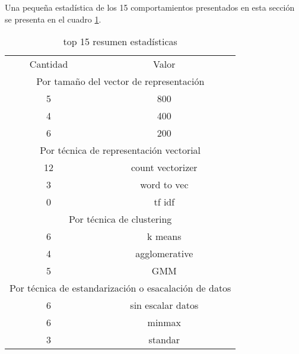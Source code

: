 \documentclass[12pt]{article}
\begin{document}
			Una pequeña estadística de los 15 comportamientos presentados en esta sección se presenta en el cuadro \ref{tab:top_15_resumen_estadísticas}.
			 
		\begin{table}[H]
		\begin{tabular}{cc}
		\multicolumn{1}{c|}{Cantidad}              & Valor                         \\ 
		\multicolumn{2}{c}{Por tamaño del vector de representación}               \\ \hline
		\multicolumn{1}{c|}{5}                     & 800                           \\ 
		\multicolumn{1}{c|}{4}                     & 400                           \\ 
		\multicolumn{1}{c|}{6}                     & 200                           \\ 
		\multicolumn{2}{c}{Por técnica de representación vectorial}               \\ \hline
		\multicolumn{1}{c|}{12}                    & count vectorizer              \\ 
		\multicolumn{1}{c|}{3}                     & word to vec                   \\ 
		\multicolumn{1}{c|}{0}                     & tf idf                        \\ 
		\multicolumn{2}{c}{Por técnica de clustering}                             \\ \hline
		\multicolumn{1}{c|}{6}                     & k means                       \\ 
		\multicolumn{1}{c|}{4}                     & agglomerative                 \\ 
		\multicolumn{1}{c|}{5}                     & GMM                           \\ 
		\multicolumn{2}{c}{Por técnica de estandarización o esacalación de datos} \\ \hline
		\multicolumn{1}{c|}{6}                     & sin escalar datos             \\ 
		\multicolumn{1}{c|}{6}                     & minmax                        \\ 
		\multicolumn{1}{c|}{3}                     & standar                       \\ 
		\end{tabular}
		\centering
		\caption{top 15 resumen estadísticas}
		\label{tab:top_15_resumen_estadísticas}
		\end{table}
		
\end{document}
